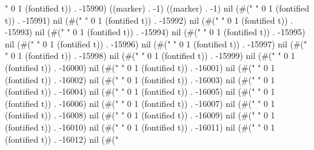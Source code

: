 " 0 1 (fontified t)) . -15990) ((marker) . -1) ((marker) . -1) nil (#(" " 0 1 (fontified t)) . -15991) nil (#(" " 0 1 (fontified t)) . -15992) nil (#(" " 0 1 (fontified t)) . -15993) nil (#(" " 0 1 (fontified t)) . -15994) nil (#(" " 0 1 (fontified t)) . -15995) nil (#(" " 0 1 (fontified t)) . -15996) nil (#(" " 0 1 (fontified t)) . -15997) nil (#(" " 0 1 (fontified t)) . -15998) nil (#(" " 0 1 (fontified t)) . -15999) nil (#(" " 0 1 (fontified t)) . -16000) nil (#(" " 0 1 (fontified t)) . -16001) nil (#(" " 0 1 (fontified t)) . -16002) nil (#(" " 0 1 (fontified t)) . -16003) nil (#(" " 0 1 (fontified t)) . -16004) nil (#(" " 0 1 (fontified t)) . -16005) nil (#(" " 0 1 (fontified t)) . -16006) nil (#(" " 0 1 (fontified t)) . -16007) nil (#(" " 0 1 (fontified t)) . -16008) nil (#(" " 0 1 (fontified t)) . -16009) nil (#(" " 0 1 (fontified t)) . -16010) nil (#(" " 0 1 (fontified t)) . -16011) nil (#(" " 0 1 (fontified t)) . -16012) nil (#("

